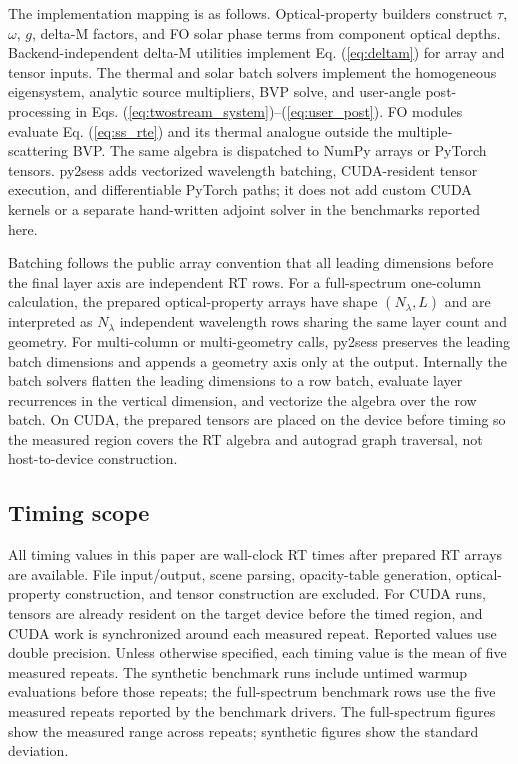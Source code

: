\documentclass[gmd, manuscript]{copernicus}
\begin{document}
The implementation mapping is as follows.  Optical-property builders construct
$\tau$, $\omega$, $g$, delta-M factors, and FO solar phase terms from component optical
depths.  Backend-independent delta-M utilities implement Eq. (\ref{eq:deltam}) for
array and tensor inputs.  The thermal and solar batch solvers implement the
homogeneous eigensystem, analytic source multipliers, BVP solve, and user-angle
post-processing in Eqs. (\ref{eq:twostream_system})--(\ref{eq:user_post}).  FO modules
evaluate Eq. (\ref{eq:ss_rte}) and its thermal analogue outside the multiple-scattering
BVP.  The same algebra is dispatched to NumPy arrays or PyTorch tensors.  py2sess adds
vectorized wavelength batching, CUDA-resident tensor execution, and differentiable
PyTorch paths; it does not add custom CUDA kernels or a separate hand-written adjoint
solver in the benchmarks reported here.

Batching follows the public array convention that all leading dimensions before the
final layer axis are independent RT rows.  For a full-spectrum one-column calculation,
the prepared optical-property arrays have shape $(N_\lambda,L)$ and are interpreted as
$N_\lambda$ independent wavelength rows sharing the same layer count and geometry.  For
multi-column or multi-geometry calls, py2sess preserves the leading batch dimensions
and appends a geometry axis only at the output.  Internally the batch solvers flatten
the leading dimensions to a row batch, evaluate layer recurrences in the vertical
dimension, and vectorize the algebra over the row batch.  On CUDA, the prepared tensors
are placed on the device before timing so the measured region covers the RT algebra and
autograd graph traversal, not host-to-device construction.

\subsection{Timing scope}

All timing values in this paper are wall-clock RT times after prepared RT arrays are
available.  File input/output, scene parsing, opacity-table generation, optical-property
construction, and tensor construction are excluded.  For CUDA runs, tensors are already
resident on the target device before the timed region, and CUDA work is synchronized
around each measured repeat.  Reported values use double precision.  Unless otherwise
specified, each timing value is the mean of five measured repeats.  The synthetic
benchmark runs include untimed warmup evaluations before those repeats; the
full-spectrum benchmark rows use the five measured repeats reported by the benchmark
drivers.  The full-spectrum figures show the measured range across repeats; synthetic
figures show the standard deviation.
\end{document}
